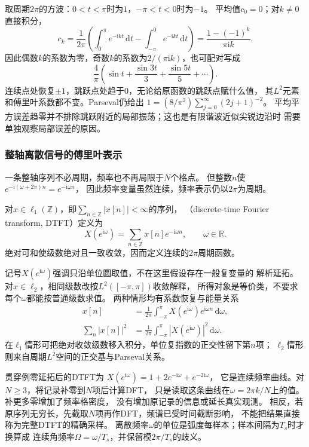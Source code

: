 取周期$2\pi$的方波：$0<t<\pi$时为$1$，$-\pi<t<0$时为$-1$。
平均值$c_0=0$；对$k\neq0$直接积分，
\[
  c_k=\frac1{2\pi}\left(
    \int_0^\pi e^{-\mathrm ikt}\,\mathrm dt
    -\int_{-\pi}^0 e^{-\mathrm ikt}\,\mathrm dt\right)
  =\frac{1-(-1)^k}{\pi\mathrm ik}.
\]
因此偶数$k$的系数为零，奇数$k$的系数为$2/(\pi\mathrm ik)$，也可配对写成
\[
  \frac4\pi\left(\sin t+\frac{\sin3t}{3}+\frac{\sin5t}{5}+\cdots\right).
\]
连续点处恢复$\pm1$，跳跃点处趋于$0$，无论给原函数的跳跃点赋什么值，
其$L^2$元素和傅里叶系数都不变。Parseval仍给出
$1=(8/\pi^2)\sum_{j=0}^{\infty}(2j+1)^{-2}$。
平均平方误差趋零并不排除跳跃附近的局部振荡；这也是有限谐波近似尖锐边沿时
需要单独观察局部误差的原因。

\subsubsection{整轴离散信号的傅里叶表示}

一条整轴序列不必周期，频率也不再局限于$N$个格点。
但整数$n$使$e^{-\mathrm i(\omega+2\pi)n}=e^{-\mathrm i\omega n}$，
因此频率变量虽然连续，频率表示仍以$2\pi$为周期。
\begin{definition}[离散时间傅里叶变换]
  \label{def:signal-analysis-dtft}
  对$x\in\ell_1(\mathbb Z)$，即$\sum_{n\in\mathbb Z}|x[n]|<\infty$的序列，
  （discrete-time Fourier transform, DTFT）定义为
  \begin{equation}
    X(e^{\mathrm i\omega})=\sum_{n\in\mathbb Z}x[n]e^{-\mathrm i\omega n},
    \qquad \omega\in\mathbb R.
    \label{eq:signal-analysis-dtft}
  \end{equation}
  绝对可和使级数绝对且一致收敛，因而定义连续的$2\pi$周期函数。
\end{definition}
记号$X(e^{\mathrm i\omega})$强调只沿单位圆取值，不在这里假设存在一般复变量的
解析延拓。对$x\in\ell_2$，相同级数改按$L^2([-\pi,\pi])$收敛解释，
所得对象是等价类，不要求每个$\omega$都能按普通级数求值。
两种情形均有系数恢复与能量关系
\begin{align*}
  x[n]&=\frac1{2\pi}\int_{-\pi}^{\pi}
  X(e^{\mathrm i\omega})e^{\mathrm i\omega n}\,\mathrm d\omega,\\
  \sum_n|x[n]|^2&=\frac1{2\pi}\int_{-\pi}^{\pi}|X(e^{\mathrm i\omega})|^2\,\mathrm d\omega.
\end{align*}
在$\ell_1$情形可把绝对收敛级数移入积分，单位复指数的正交性留下第$n$项；
$\ell_2$情形则来自周期$L^2$空间的正交基与Parseval关系。

贯穿例零延拓后的DTFT为
$X(e^{\mathrm i\omega})=1+2e^{-\mathrm i\omega}+e^{-2\mathrm i\omega}$，
它是连续频率曲线。对$N\geq3$，将记录补零到$N$项后计算DFT，
只是读取这条曲线在$\omega=2\pi k/N$上的值。补更多零增加了频率格密度，
没有增加原记录的信息或延长真实观测。
相反，若原序列无穷长，先截取$N$项再作DFT，频谱已受时间截断影响，
不能把结果直接称为完整DTFT的精确采样。
离散频率$\omega$的单位是弧度每样本；样本间隔为$T_s$时才换算成
连续角频率$\Omega=\omega/T_s$，并保留模$2\pi/T_s$的歧义。

